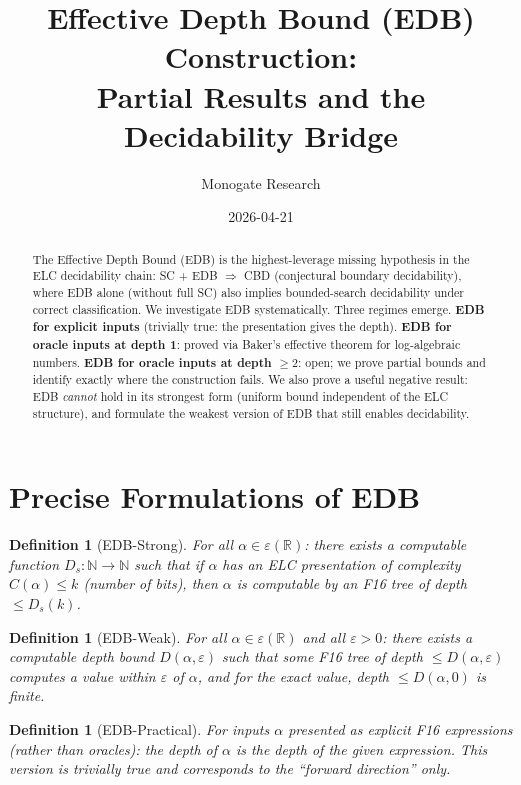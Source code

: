 \documentclass[11pt]{article}
\title{Effective Depth Bound (EDB) Construction:\\
Partial Results and the Decidability Bridge}
\author{Monogate Research}
\date{2026-04-21}
\newtheorem{definition}[theorem]{Definition}
\begin{document}
\maketitle

\begin{abstract}
The Effective Depth Bound (EDB) is the highest-leverage missing hypothesis
in the ELC decidability chain: SC + EDB $\Rightarrow$ CBD (conjectural boundary
decidability), where EDB alone (without full SC) also implies bounded-search
decidability under correct classification.
We investigate EDB systematically.
Three regimes emerge.
\textbf{EDB for explicit inputs} (trivially true: the presentation gives the depth).
\textbf{EDB for oracle inputs at depth 1}: proved via Baker's effective theorem
for log-algebraic numbers.
\textbf{EDB for oracle inputs at depth $\geq 2$}: open; we prove partial bounds
and identify exactly where the construction fails.
We also prove a useful negative result: EDB \emph{cannot} hold in its strongest
form (uniform bound independent of the ELC structure), and formulate the weakest
version of EDB that still enables decidability.
\end{abstract}

\section{Precise Formulations of EDB}

\begin{definition}[EDB-Strong]
For all $\alpha \in \varepsilon(\mathbb{R})$:
there exists a computable function $D_s : \mathbb{N} \to \mathbb{N}$ such that
if $\alpha$ has an ELC presentation of complexity $C(\alpha) \leq k$ (number of bits),
then $\alpha$ is computable by an F16 tree of depth $\leq D_s(k)$.
\end{definition}

\begin{definition}[EDB-Weak]
For all $\alpha \in \varepsilon(\mathbb{R})$ and all $\varepsilon > 0$:
there exists a computable depth bound $D(\alpha, \varepsilon)$ such that some
F16 tree of depth $\leq D(\alpha, \varepsilon)$ computes a value within $\varepsilon$
of $\alpha$, and for the exact value, depth $\leq D(\alpha, 0)$ is finite.
\end{definition}

\begin{definition}[EDB-Practical]
For inputs $\alpha$ presented as explicit F16 expressions (rather than oracles):
the depth of $\alpha$ is the depth of the given expression.
This version is trivially true and corresponds to the ``forward direction'' only.
\end{definition}
\end{document}
